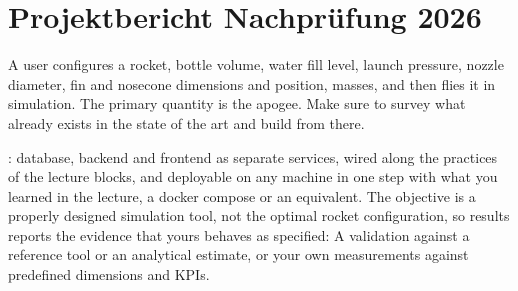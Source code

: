 %

\chapter{Projektbericht Nachprüfung 2026}

A user configures a rocket, bottle volume,
water fill level, launch pressure, nozzle diameter, fin and nosecone dimensions and position, masses, and then flies it in
simulation. The primary quantity is the apogee. Make sure to survey what already exists in the state of the art and build from there.


: database, backend and
frontend as separate services, wired along the practices of the lecture blocks, and deployable
on any machine in one step with what you learned in the lecture, a docker compose or an equivalent.
The objective is a properly designed simulation tool, not the optimal rocket configuration, so results reports the evidence that yours behaves as
specified: A validation against a reference tool or an analytical estimate, or your own measurements
against predefined dimensions and KPIs.

